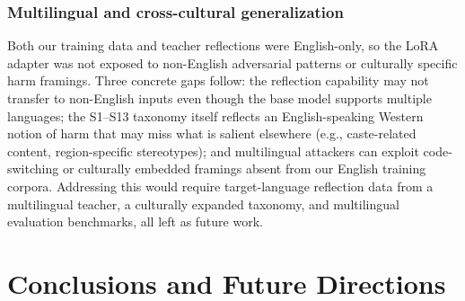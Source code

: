 \documentclass[superintelligence,article,accept,moreauthors]{Definitions/mdpi}
\begin{document}
\subsubsection{Multilingual and cross-cultural generalization}
Both our training data and teacher reflections were English-only, so the LoRA adapter was not exposed to non-English adversarial patterns or culturally specific harm framings. Three concrete gaps follow: the reflection capability may not transfer to non-English inputs even though the base model supports multiple languages; the S1--S13 taxonomy itself reflects an English-speaking Western notion of harm that may miss what is salient elsewhere (e.g., caste-related content, region-specific stereotypes); and multilingual attackers can exploit code-switching or culturally embedded framings absent from our English training corpora. Addressing this would require target-language reflection data from a multilingual teacher, a culturally expanded taxonomy, and multilingual evaluation benchmarks, all left as future work.

\section{Conclusions and Future Directions}
\end{document}
